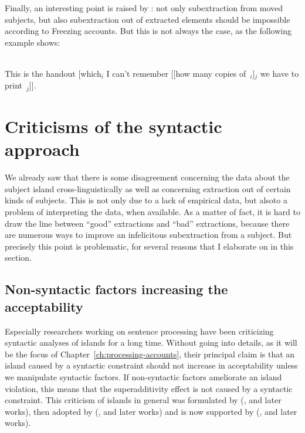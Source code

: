 Finally, an interesting point is raised by \citet{Chaves.2020.UDC}: not only subextraction from moved subjects, but also subextraction out of extracted elements should be impossible according to Freezing accounts.  But this is not always the case, as the following example shows:

\ea \citep[52]{Chaves.2020.UDC}\nopagebreak\\
This is the handout [which$_i$ I can't remember [[how many copies of~\trace{}$_i$]$_j$ we have to print~\trace{}$_j$]]. 
\z 



\section{Criticisms of the syntactic approach}

We already saw that there is some disagreement concerning the data about the subject island cross-linguistically as well as concerning extraction out of certain kinds of subjects. This is not only due to a lack of empirical data, but alsoto a problem of interpreting the data, when available. As a matter of fact, it is hard to draw the line between ``good'' extractions and ``bad'' extractions, because there are numerous ways to improve an infelicitous subextraction from a subject. But precisely this point is problematic, for several reasons that I elaborate on in this section.

\subsection{Non-syntactic factors increasing the acceptability}

Especially researchers working on sentence processing have been criticizing syntactic analyses of islands for a long time. Without going into details, as it will be the focus of Chapter~\ref{ch:processing-accounts}, their principal claim is that an island caused by a syntactic constraint should not increase in acceptability unless we manipulate syntactic factors. If non-syntactic factors ameliorate an island violation, this means that the superadditivity effect is not caused by a syntactic constraint. This criticism of islands in general was formulated by \citeauthor{Kluender.1991} (\citeyear{Kluender.1991}, and later works), then adopted by \citeauthor{Hofmeister.2010} (\citeyear{Hofmeister.2010}, and later works) and is now supported by \citeauthor{Chaves.2013} (\citeyear{Chaves.2013}, and later works). 

